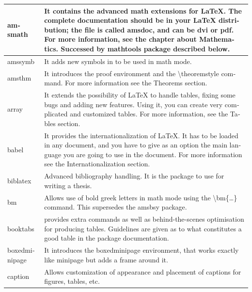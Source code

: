 \begin{latin}
\begin{longtable}{| p{} | p{} |}
 \hline
  amsmath &It contains the advanced math extensions for LaTeX. The complete documentation should be in your LaTeX distribution; the file is called amsdoc, and can be dvi or pdf. For more information, see the chapter about Mathematics. Successed by mathtools package described below.\\\hline
amssymb&It adds new symbols in to be used in math mode.\\\hline
amsthm&It introduces the proof environment and the {\color{green}\textbackslash{theoremstyle}} command. For more information see the Theorems section.\\\hline
array&It extends the possibility of LaTeX to handle tables, fixing some bugs and adding new features. Using it, you can create very complicated and customized tables. For more information, see the Tables section.\\\hline
babel&It provides the internationalization of LaTeX. It has to be loaded in any document, and you have to give as an option the main language you are going to use in the document. For more information see the Internationalization section.\\\hline
biblatex&Advanced bibliography handling. It is the package to use for writing a thesis.\\\hline
bm&Allows use of bold greek letters in math mode using the{\color{green} \textbackslash{bm}\{\dots\}} command. This supersedes the amsbsy package.\\\hline
booktabs &provides ex­tra com­mands as well as be­hind-the-scenes op­ti­mi­sa­tion for producing tables. Guide­lines are given as to what con­sti­tutes a good ta­ble in the package documentation.\\\hline
boxedminipage &It introduces the boxedminipage environment, that works exactly like minipage but adds a frame around it.\\\hline
caption &Allows customization of appearance and placement of captions for figures, tables, etc.\\\hline

\end{longtable}
\end{latin}
